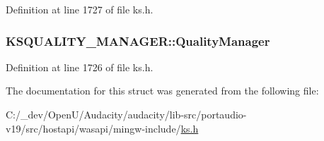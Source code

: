 Definition at line 1727 of file ks.\+h.

\subsubsection[{\texorpdfstring{Quality\+Manager}{QualityManager}}]{ K\+S\+Q\+U\+A\+L\+I\+T\+Y\+\_\+\+M\+A\+N\+A\+G\+E\+R\+::\+Quality\+Manager}\hypertarget{struct_k_s_q_u_a_l_i_t_y___m_a_n_a_g_e_r_a651005190b4905523baf47adeacd4c13}{}\label{struct_k_s_q_u_a_l_i_t_y___m_a_n_a_g_e_r_a651005190b4905523baf47adeacd4c13}


Definition at line 1726 of file ks.\+h.



The documentation for this struct was generated from the following file\+:\begin{DoxyCompactItemize}
\item 
C\+:/\+\_\+dev/\+Open\+U/\+Audacity/audacity/lib-\/src/portaudio-\/v19/src/hostapi/wasapi/mingw-\/include/\hyperlink{ks_8h}{ks.\+h}\end{DoxyCompactItemize}
